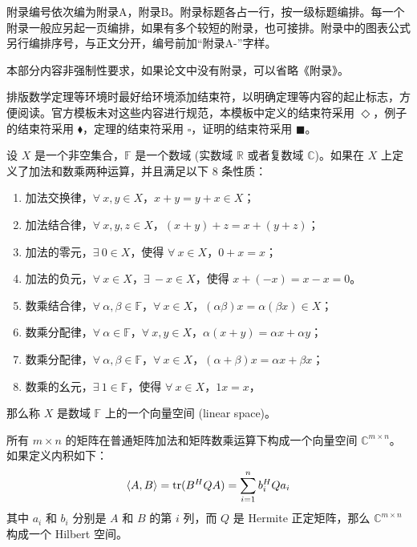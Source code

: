 

附录编号依次编为附录A，附录B。附录标题各占一行，按一级标题编排。每一个附录一般应另起一页编排，如果有多个较短的附录，也可接排。附录中的图表公式另行编排序号，与正文分开，编号前加“附录A-”字样。

{\color{red} 本部分内容非强制性要求，如果论文中没有附录，可以省略《附录》。}

排版数学定理等环境时最好给环境添加结束符，以明确定理等内容的起止标志，方便阅读。官方模板未对这些内容进行规范，本模板中定义的结束符采用 $\Diamond$，例子的结束符采用 $\blacklozenge$，定理的结束符采用 $\square$，证明的结束符采用 $\blacksquare$。

\begin{definition}[向量空间]
	设 $X$ 是一个非空集合，$\mathbb{F}$ 是一个数域 (实数域 $\mathbb{R}$ 或者复数域 $\mathbb{C}$)。如果在 $X$ 上定义了加法和数乘两种运算，并且满足以下 8 条性质：
	\begin{enumerate}
		\item 加法交换律，$\forall~x,y \in X$，$x+y = y+x \in X$；
		\item 加法结合律，$\forall~x,y,z \in X$，$(x+y)+z = x+(y+z)$；
		\item 加法的零元，$\exists~0 \in X$，使得 $\forall~x \in X$，$0+x = x$；
		\item 加法的负元，$\forall~x \in X$，$\exists~-x \in X$，使得 $x+(-x) = x-x = 0$。
		\item 数乘结合律，$\forall~\alpha,\beta \in \mathbb{F}$，$\forall~x \in X$，$(\alpha\beta)x = \alpha(\beta x) \in X$；
		\item 数乘分配律，$\forall~\alpha \in \mathbb{F}$，$\forall~x,y \in X$，$\alpha(x+y) = \alpha x + \alpha y$；
		\item 数乘分配律，$\forall~\alpha,\beta \in \mathbb{F}$，$\forall~x \in X$，$(\alpha+\beta)x = \alpha x + \beta x$；
		\item 数乘的幺元，$\exists~1 \in \mathbb{F}$，使得 $\forall~x \in X$，$1 x = x$，
	\end{enumerate}
	那么称 $X$ 是数域 $\mathbb{F}$ 上的一个{\hei 向量空间} (linear space)。
\end{definition}

\begin{example}[矩阵空间]
	所有 $m\times n$ 的矩阵在普通矩阵加法和矩阵数乘运算下构成一个向量空间 $\mathbb{C}^{m\times n}$。如果定义内积如下：
	\begin{equation}
	\langle A,B \rangle = \mathrm{tr}(B^H Q A) = \sum_{i=1}^{n} b_i^H Q a_i
	\end{equation}
	其中 $a_i$ 和 $b_i$ 分别是 $A$ 和 $B$ 的第 $i$ 列，而 $Q$ 是 Hermite 正定矩阵，那么 $\mathbb{C}^{m\times n}$ 构成一个 Hilbert 空间。
\end{example}

